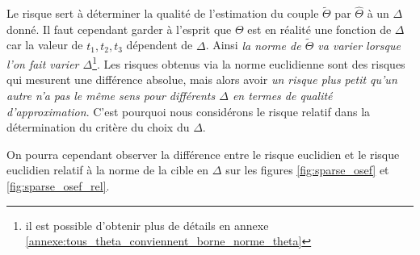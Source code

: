 
Le risque sert à déterminer la qualité de l'estimation du couple $\widetilde \Theta$ par $\widehat \Theta$ à un $\Delta$ donné. Il faut cependant garder à l'esprit que $\Theta$ est en réalité une fonction de $\Delta$ car la valeur de $t_1, t_2, t_3$ dépendent de $\Delta$. Ainsi \emph{la norme de $\widetilde \Theta$ va varier lorsque l'on fait varier $\Delta$}\footnote{il est possible d'obtenir plus de détails en annexe \ref{annexe:tous_theta_conviennent_borne_norme_theta}}. Les risques obtenus via la norme euclidienne sont des risques qui mesurent une différence absolue, mais alors avoir \emph{un risque plus petit qu'un autre n'a pas le même sens pour différents $\Delta$ en termes de qualité d'approximation}. C'est pourquoi nous considérons le risque relatif dans la détermination du critère du choix du $\Delta$.

On pourra cependant observer la différence entre le risque euclidien et le risque euclidien relatif à la norme de la cible en $\Delta$ sur les figures \ref{fig:sparse_osef} et \ref{fig:sparse_osef_rel}.